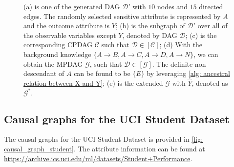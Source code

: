 \documentclass{article} %
\begin{document}
\begin{figure}[ht]
{ }
\caption{(a) is one of the generated DAG $\mathcal{D'}$ with $10$ nodes and $15$ directed edges. The randomly selected sensitive attribute is represented by $A$ and the outcome attribute is $Y$; (b) is the subgraph of $\mathcal{D'}$ over all of the observable variables except $Y$, denoted by DAG $\mathcal{D}$; (c) is the corresponding CPDAG $\mathcal{C}$ such that $\mathcal{D} \in [\mathcal{C}]$; (d) With the background knowledge $\{A \rightarrow B, A \rightarrow C, A \rightarrow D, A \rightarrow N\}$, we can obtain the MPDAG $\mathcal{G}$, such that $\mathcal{D} \in [\mathcal{G}]$. The definite non-descendant of $A$ can be found to be $\{E\}$ by leveraging \cref{alg: ancestral relation between X and Y}; (e) is the extended-$\mathcal{G}$ with $\hat{Y}$, denoted as $\mathcal{G^*}$.}
\label{fig: SimulationGraph}
\end{figure}




\newpage
\subsection{Causal graphs for the UCI Student Dataset} \label{Appendix: Causal graphs for Student Dataset}

The causal graphs for the UCI Student Dataset is provided in \cref{fig: causal_graph_student}. The attribute information can be found at \url{https://archive.ics.uci.edu/ml/datasets/Student+Performance}.
\end{document}
